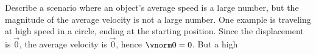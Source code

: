 {Describe a scenario where an object's average speed is a large number, but the magnitude of the average velocity is not a large number.
}
{
One example is traveling at high speed in a circle, ending at the starting position. Since the displacement is $\vec 0$, the average velocity is $\vec 0$, hence $\vnorm 0=0$. But a high 
}

